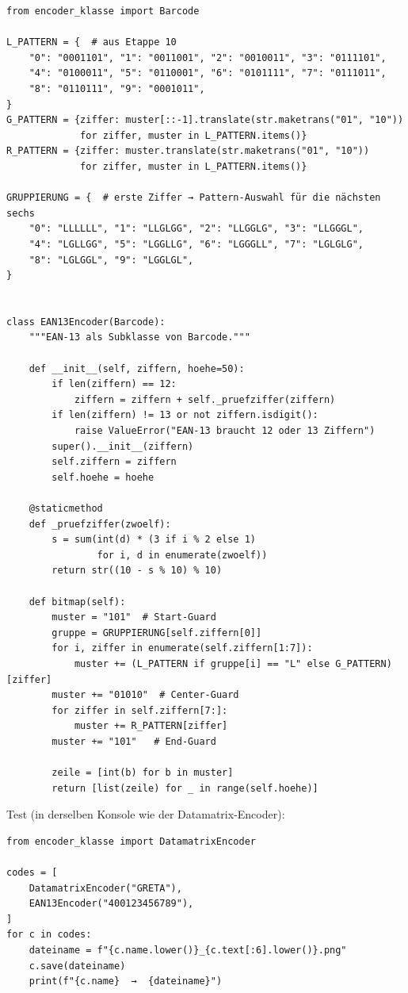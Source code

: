 \begin{verbatim}
from encoder_klasse import Barcode

L_PATTERN = {  # aus Etappe 10
    "0": "0001101", "1": "0011001", "2": "0010011", "3": "0111101",
    "4": "0100011", "5": "0110001", "6": "0101111", "7": "0111011",
    "8": "0110111", "9": "0001011",
}
G_PATTERN = {ziffer: muster[::-1].translate(str.maketrans("01", "10"))
             for ziffer, muster in L_PATTERN.items()}
R_PATTERN = {ziffer: muster.translate(str.maketrans("01", "10"))
             for ziffer, muster in L_PATTERN.items()}

GRUPPIERUNG = {  # erste Ziffer → Pattern-Auswahl für die nächsten sechs
    "0": "LLLLLL", "1": "LLGLGG", "2": "LLGGLG", "3": "LLGGGL",
    "4": "LGLLGG", "5": "LGGLLG", "6": "LGGGLL", "7": "LGLGLG",
    "8": "LGLGGL", "9": "LGGLGL",
}


class EAN13Encoder(Barcode):
    """EAN-13 als Subklasse von Barcode."""

    def __init__(self, ziffern, hoehe=50):
        if len(ziffern) == 12:
            ziffern = ziffern + self._pruefziffer(ziffern)
        if len(ziffern) != 13 or not ziffern.isdigit():
            raise ValueError("EAN-13 braucht 12 oder 13 Ziffern")
        super().__init__(ziffern)
        self.ziffern = ziffern
        self.hoehe = hoehe

    @staticmethod
    def _pruefziffer(zwoelf):
        s = sum(int(d) * (3 if i % 2 else 1)
                for i, d in enumerate(zwoelf))
        return str((10 - s % 10) % 10)

    def bitmap(self):
        muster = "101"  # Start-Guard
        gruppe = GRUPPIERUNG[self.ziffern[0]]
        for i, ziffer in enumerate(self.ziffern[1:7]):
            muster += (L_PATTERN if gruppe[i] == "L" else G_PATTERN)[ziffer]
        muster += "01010"  # Center-Guard
        for ziffer in self.ziffern[7:]:
            muster += R_PATTERN[ziffer]
        muster += "101"   # End-Guard

        zeile = [int(b) for b in muster]
        return [list(zeile) for _ in range(self.hoehe)]
\end{verbatim}

Test (in derselben Konsole wie der Datamatrix-Encoder):

\begin{verbatim}
from encoder_klasse import DatamatrixEncoder

codes = [
    DatamatrixEncoder("GRETA"),
    EAN13Encoder("400123456789"),
]
for c in codes:
    dateiname = f"{c.name.lower()}_{c.text[:6].lower()}.png"
    c.save(dateiname)
    print(f"{c.name}  →  {dateiname}")
\end{verbatim}

